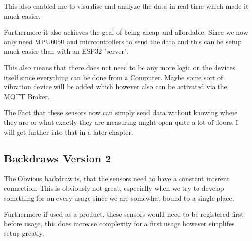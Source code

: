 This also enabled me to visualise and analyze the data in real-time which made it much easier. 

Furthermore it also achieves the goal of being cheap and affordable. Since we now only need MPU6050 and micrcontrollers to send the data and this can be setup much easier than with an ESP32 "server".

This also means that there does not need to be any more logic on the devices itself since everything can be done from a Computer. Maybe some sort of vibration device will be added which however also can be activated via the MQTT Broker. 

The Fact that these sensors now can simply send data without knowing where they are or what exactly they are measuring might open quite a lot of doors. I will get further into that in a later chapter.

\subsection{Backdraws Version 2}

The Obvious backdraw is, that the sensors need to have a constant interent connection. This is obviously not great, especially when we try to develop something for an every usage since we are somewhat bound to a single place. 

Furthermore if used as a product, these sensors would need to be registered first before usage, this does increase complexity for a first usage however simplifes setup greatly.





